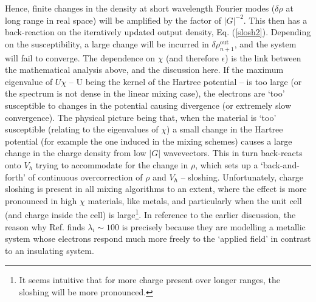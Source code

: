 Hence, finite changes in the density at short wavelength Fourier modes ($\delta \rho$ at long range in real space) will be amplified by the factor of $|G|^{-2}$. This then has a back-reaction on the iteratively updated output density, Eq$.$ (\ref{slosh2}). Depending on the susceptibility, a large change will be incurred in $\delta \rho^{\text{out}}_{n+1}$, and the system will fail to converge. The dependence on $\chi$ (and therefore $\epsilon$) is the link between the mathematical analysis above, and the discussion here. If the maximum eigenvalue of $U \chi$ -- U being the kernel of the Hartree potential -- is too large (or the spectrum is not dense in the linear mixing case), the electrons are `too' susceptible to changes in the potential causing divergence (or extremely slow convergence). The physical picture being that, when the material is `too' susceptible (relating to the eigenvalues of $\chi$) a small change in the Hartree potential (for example the one induced in the mixing schemes) causes a large change in the charge density from low $|G|$ wavevectors. This in turn back-reacts onto $V_h$ trying to accommodate for the change in $\rho$, which sets up a `back-and-forth' of continuous overcorrection of $\rho$ and $V_h$ -- sloshing. Unfortunately, charge sloshing is present in all mixing algorithms to an extent, where the effect is more pronounced in high $\chi$ materials, like metals, and particularly when the unit cell (and charge inside the cell) is large\footnote{It seems intuitive that for more charge present over longer ranges, the sloshing will be more pronounced.}. In reference to the earlier discussion, the reason why Ref$.$ \citep{linear} finds $\lambda_i \sim 100$ is precisely because they are modelling a metallic system whose electrons respond much more freely to the `applied field' in contrast to an insulating system. 

